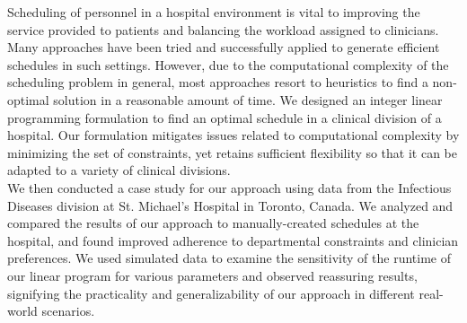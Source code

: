 Scheduling of personnel in a hospital environment is vital to improving the
service provided to patients and balancing the workload assigned to clinicians.
Many approaches have been tried and successfully applied to generate efficient
schedules in such settings. However, due to the computational complexity of the
scheduling problem in general, most approaches resort to heuristics to find a
non-optimal solution in a reasonable amount of time. We designed an integer
linear programming formulation to find an optimal schedule in a clinical
division of a hospital. Our formulation mitigates issues related to
computational complexity by minimizing the set of constraints, yet retains
sufficient flexibility so that it can be adapted to a variety of clinical
divisions. \\

We then conducted a case study for our approach using data from the Infectious
Diseases division at St. Michael's Hospital in Toronto, Canada. We analyzed and
compared the results of our approach to manually-created schedules at the
hospital, and found improved adherence to departmental constraints and clinician
preferences. We used simulated data to examine the sensitivity of the runtime of
our linear program for various parameters and observed reassuring results,
signifying the practicality and generalizability of our approach in different
real-world scenarios.
